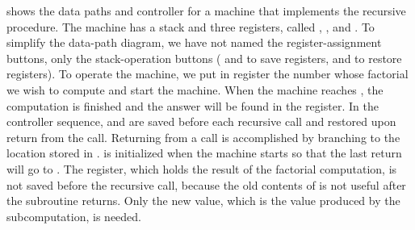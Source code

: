  shows the data paths and controller for a machine that
implements the recursive  procedure.  The machine has a stack
and three registers, called , , and .  To
simplify the data-path diagram, we have not named the register-assignment
buttons, only the stack-operation buttons ( and  to save
registers,  and  to restore registers).  To operate the
machine, we put in register  the number whose factorial we wish to
compute and start the machine.  When the machine reaches , the
computation is finished and the answer will be found in the 
register.  In the controller sequence,  and  are saved
before each recursive call and restored upon return from the call.  Returning
from a call is accomplished by branching to the location stored in
.   is initialized when the machine starts so
that the last return will go to .  The  register,
which holds the result of the factorial computation, is not saved before the
recursive call, because the old contents of  is not useful after the
subroutine returns.  Only the new value, which is the value produced by the
subcomputation, is needed.

